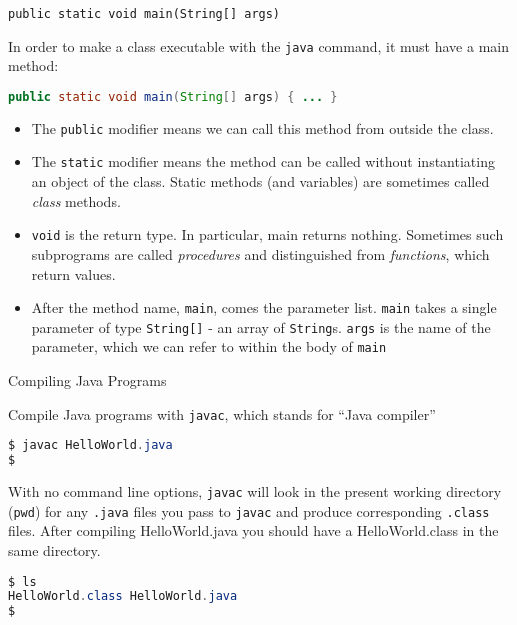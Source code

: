 \documentclass{beamer}
\begin{document}
\begin{frame}[fragile]{{\tt public static void main(String[] args)}}


In order to make a class executable with the {\tt java} command, it must have a main method:
\begin{lstlisting}[language=Java]
public static void main(String[] args) { ... }
\end{lstlisting}
\vspace{-.1in}
\begin{itemize}
\item The {\tt public} modifier means we can call this method from outside the class.
\item The {\tt static} modifier means the method can be called without instantiating an object of the class.  Static methods (and variables) are sometimes called {\it class} methods.
\item {\tt void} is the return type.  In particular, main returns nothing.  Sometimes such subprograms are called {\it procedures} and distinguished from {\it functions}, which return values.
\item After the method name, {\tt main}, comes the parameter list.  {\tt main} takes a single parameter of type {\tt String[]} - an array of {\tt String}s.  {\tt args} is the name of the parameter, which we can refer to within the body of {\tt main}
\end{itemize}

\end{frame}


\begin{frame}[fragile]{Compiling Java Programs}


Compile Java programs with {\tt javac}, which stands for ``Java compiler''
\begin{lstlisting}[language=Java]
$ javac HelloWorld.java
$
\end{lstlisting}
With no command line options, {\tt javac} will look in the present working directory ({\tt pwd}) for any {\tt .java} files you pass to {\tt javac} and produce corresponding {\tt .class} files.  After compiling HelloWorld.java you should have a HelloWorld.class in the same directory.

\begin{lstlisting}[language=Java]
$ ls
HelloWorld.class HelloWorld.java
$
\end{lstlisting}


\end{frame}
\end{document}
